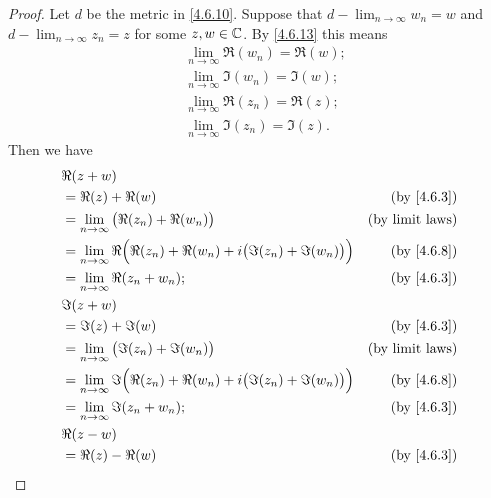 \begin{proof}
  Let \(d\) be the metric in \cref{4.6.10}.
  Suppose that \(d - \lim_{n \to \infty} w_n = w\) and \(d - \lim_{n \to \infty} z_n = z\) for some \(z, w \in \mathbb{C}\).
  By \cref{4.6.13} this means
  \begin{align*}
     & \lim_{n \to \infty} \Re(w_n) = \Re(w); \\
     & \lim_{n \to \infty} \Im(w_n) = \Im(w); \\
     & \lim_{n \to \infty} \Re(z_n) = \Re(z); \\
     & \lim_{n \to \infty} \Im(z_n) = \Im(z).
  \end{align*}
  Then we have
  \begin{align*}
     & \Re(z + w)                                                                                                          \\
     & = \Re(z) + \Re(w)                                                                        & \text{(by \cref{4.6.3})} \\
     & = \lim_{n \to \infty} \big(\Re(z_n) + \Re(w_n)\big)                                      & \text{(by limit laws)}   \\
     & = \lim_{n \to \infty} \Re\Big(\Re(z_n) + \Re(w_n) + i \big(\Im(z_n) + \Im(w_n)\big)\Big) & \text{(by \cref{4.6.8})} \\
     & = \lim_{n \to \infty} \Re(z_n + w_n);                                                    & \text{(by \cref{4.6.3})} \\
     & \Im(z + w)                                                                                                          \\
     & = \Im(z) + \Im(w)                                                                        & \text{(by \cref{4.6.3})} \\
     & = \lim_{n \to \infty} \big(\Im(z_n) + \Im(w_n)\big)                                      & \text{(by limit laws)}   \\
     & = \lim_{n \to \infty} \Im\Big(\Re(z_n) + \Re(w_n) + i \big(\Im(z_n) + \Im(w_n)\big)\Big) & \text{(by \cref{4.6.8})} \\
     & = \lim_{n \to \infty} \Im(z_n + w_n);                                                    & \text{(by \cref{4.6.3})} \\
     & \Re(z - w)                                                                                                          \\
     & = \Re(z) - \Re(w)                                                                        & \text{(by \cref{4.6.3})} \\

\end{align*}
\end{proof}
